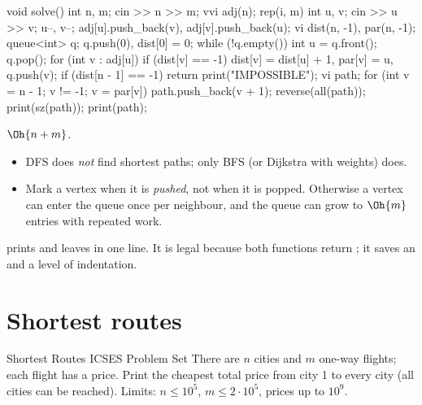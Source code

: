 \begin{code}
void solve() {
    int n, m;
    cin >> n >> m;
    vvi adj(n);
    rep(i, m) {
        int u, v;
        cin >> u >> v;
        u--, v--;
        adj[u].push_back(v), adj[v].push_back(u);
    }
    vi dist(n, -1), par(n, -1);
    queue<int> q;
    q.push(0), dist[0] = 0;
    while (!q.empty()) {
        int u = q.front();
        q.pop();
        for (int v : adj[u])
            if (dist[v] == -1) dist[v] = dist[u] + 1, par[v] = u, q.push(v);
    }
    if (dist[n - 1] == -1) return print("IMPOSSIBLE");
    vi path;
    for (int v = n - 1; v != -1; v = par[v]) path.push_back(v + 1);
    reverse(all(path));
    print(sz(path));
    print(path);
}
\end{code}

 $\Oh{n + m}$.

\begin{pitfall}
\begin{itemize}
  \item DFS does \emph{not} find shortest paths; only BFS (or Dijkstra with weights) does.
  \item Mark a vertex when it is \emph{pushed}, not when it is popped. Otherwise a vertex can enter the queue once per
        neighbour, and the queue can grow to $\Oh{m}$ entries with repeated work.
\end{itemize}
\end{pitfall}

\begin{tip}
 prints and leaves  in one line. It is legal because both functions return
; it saves an  and a level of indentation.
\end{tip}

\section[Shortest routes]{Shortest routes \hfill \gold}\label{wp:dijkstra}

\begin{statement}{Shortest Routes I}{CSES Problem Set}
There are $n$ cities and $m$ one-way flights; each flight has a price. Print the cheapest total price from city 1 to every
city (all cities can be reached). Limits: $n \le 10^5$, $m \le 2\cdot10^5$, prices up to $10^9$.
\end{statement}

